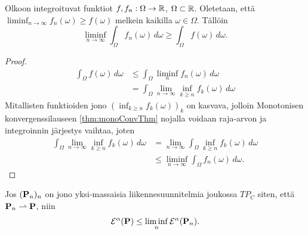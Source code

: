 \documentclass[12pt,oneside,a4paper]{amsbook} %
\begin{document}
\begin{lemma}\label{le:intRFctLSC} 
    Olkoon integroituvat funktiot $f, f_n : \Omega \to \R$, $\Omega \subset \R$. Oletetaan, että $\displaystyle \liminf_{n\to\infty} f_n(\omega) \ge f(\omega)$ melkein kaikilla $\omega \in \Omega$. Tällöin
        \begin{equation*}
            \liminf_{n\to \infty} \int_\Omega f_n(\omega) \, d\omega \ge \int_\Omega f(\omega)\, d\omega.
        \end{equation*}
\end{lemma}
\begin{proof}
    \begin{align*}
        \int_\Omega f(\omega) \, d\omega &\le \int_\Omega \liminf_n f_n(\omega) \, d\omega \\
        & = \int_\Omega \lim_{n\to\infty} \inf_{k\ge n} f_k(\omega) \, d\omega
    \end{align*}
 Mitallisten funktioiden jono $(\inf_{k\ge n}f_k(\omega))_k$ on kasvava, jolloin Monotonisen konvergenssilauseen \ref{thm:monoConvThm} nojalla voidaan raja-arvon ja integroinnin järjestys vaihtaa, joten
    \begin{align*}
         \int_\Omega \lim_{n\to\infty} \inf_{k\ge n} f_k(\omega) \, d\omega &= \lim_{n\to\infty} \int_\Omega \inf_{k\ge n} f_k(\omega) \, d\omega \\
        &\le  \liminf_{n\to\infty} \int_\Omega f_n(\omega) \, d\omega. 
    \end{align*}
\end{proof}

\begin{theorem}\label{thm:energyLSC}
    Jos $(\P_n)_n$ on jono yksi-massaisia liikennesuunnitelmia joukossa $TP_C$ siten, että $\P_n \rightharpoonup \P$, niin
        \begin{equation*}
            \E^\alpha(\P) \le \liminf_n \E^\alpha(\P_n).
        \end{equation*}
\end{theorem}
\end{document}
